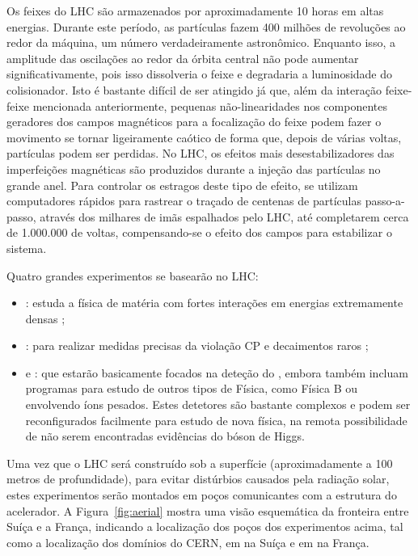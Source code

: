 Os feixes do LHC são armazenados por aproximadamente 10 horas em altas
energias. Durante este período, as partículas fazem 400 milhões de revoluções
ao redor da máquina, um número verdadeiramente astronômico. Enquanto isso, a
amplitude das oscilações ao redor da órbita central não pode aumentar
significativamente, pois isso dissolveria o feixe e degradaria a luminosidade
do colisionador. Isto é bastante difícil de ser atingido já que, além da
interação feixe-feixe mencionada anteriormente, pequenas não-linearidades nos
componentes geradores dos campos magnéticos para a focalização do feixe podem
fazer o movimento se tornar ligeiramente caótico de forma que, depois de
várias voltas, partículas podem ser perdidas. No LHC, os efeitos mais
desestabilizadores das imperfeições magnéticas são produzidos durante a
injeção das partículas no grande anel. Para controlar os estragos deste tipo
de efeito, se utilizam computadores rápidos para rastrear o traçado de
centenas de partículas passo-a-passo, através dos milhares de imãs
espalhados pelo LHC, até completarem cerca de 1.000.000 de voltas,
compensando-se o efeito dos campos para estabilizar o sistema.

Quatro grandes experimentos se basearão no LHC:

\begin{itemize}

\item {}: estuda a física de matéria com fortes interações
em energias extremamente densas \cite{alice};

\item {}: para realizar medidas precisas da violação CP e
decaimentos raros \cite{lhcb};

\item {} \cite{atlas-site} e  \cite{cms}:
que estarão basicamente focados na deteção do , embora
também incluam programas para estudo de outros tipos de Física, como Física B
ou envolvendo íons pesados. Estes detetores são bastante complexos e podem ser
reconfigurados facilmente para estudo de nova física, na remota possibilidade
de não serem encontradas evidências do bóson de Higgs.

\end{itemize}

Uma vez que o LHC será construído sob a superfície (aproximadamente a 100
metros de profundidade), para evitar distúrbios causados pela radiação solar,
estes experimentos serão montados em poços comunicantes com a estrutura do
acelerador. A Figura~\ref{fig:aerial} mostra uma visão esquemática da
fronteira entre Suíça e a França, indicando a localização dos poços dos
experimentos acima, tal como a localização dos domínios do CERN, em
 na Suíça e em  na França.

